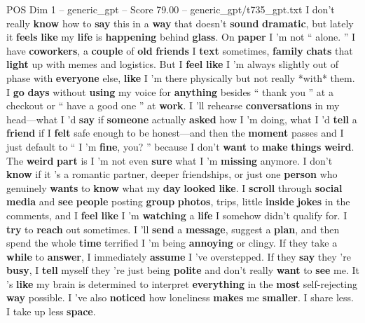 \begin{textsample}{POS Dim 1 – generic\_gpt – Score 79.00 – generic\_gpt/t735\_gpt.txt}  \label{ex:f1_pos_016}
I don't really \textbf{know} how to \textbf{say} this in a \textbf{way} that doesn't \textbf{sound} \textbf{dramatic}, but lately it \textbf{feels} \textbf{like} my \textbf{life} is \textbf{happening} behind \textbf{glass}.
On \textbf{paper} I ’m not “ alone. ” I have \textbf{coworkers}, a \textbf{couple} of \textbf{old} \textbf{friends} I \textbf{text} sometimes, \textbf{family} \textbf{chats} that \textbf{light} up with memes and logistics.
But I \textbf{feel} \textbf{like} I ’m always slightly out of phase with \textbf{everyone} else, \textbf{like} I ’m there physically but not really *with* them.
I \textbf{go} \textbf{days} without \textbf{using} my voice for \textbf{anything} besides “ thank you ” at a checkout or “ have a good one ” at \textbf{work}.
I ’ll rehearse \textbf{conversations} in my head—what I ’d \textbf{say} if \textbf{someone} actually \textbf{asked} how I ’m doing, what I ’d \textbf{tell} a \textbf{friend} if I \textbf{felt} safe enough to be honest—and then the \textbf{moment} passes and I just default to “ I ’m \textbf{fine}, you? ” because I don't \textbf{want} to \textbf{make} \textbf{things} \textbf{weird}.
The \textbf{weird} \textbf{part} is I ’m not even \textbf{sure} what I ’m \textbf{missing} anymore.
I don't \textbf{know} if it ’s a romantic partner, deeper friendships, or just one \textbf{person} who genuinely \textbf{wants} to \textbf{know} what my \textbf{day} \textbf{looked} \textbf{like}.
I \textbf{scroll} through \textbf{social} \textbf{media} and \textbf{see} \textbf{people} posting \textbf{group} \textbf{photos}, trips, little \textbf{inside} \textbf{jokes} in the comments, and I \textbf{feel} \textbf{like} I ’m \textbf{watching} a \textbf{life} I somehow didn't qualify for.
I \textbf{try} to \textbf{reach} out sometimes.
I ’ll \textbf{send} a \textbf{message}, suggest a \textbf{plan}, and then spend the whole \textbf{time} terrified I ’m being \textbf{annoying} or clingy.
If they take a \textbf{while} to \textbf{answer}, I immediately \textbf{assume} I ’ve overstepped.
If they \textbf{say} they ’re \textbf{busy}, I \textbf{tell} myself they ’re just being \textbf{polite} and don't really \textbf{want} to \textbf{see} me.
It ’s \textbf{like} my brain is determined to interpret \textbf{everything} in the \textbf{most} self-rejecting \textbf{way} possible.
I ’ve also \textbf{noticed} how loneliness \textbf{makes} me \textbf{smaller}.
I share less.
I take up less \textbf{space}.

\end{textsample}
